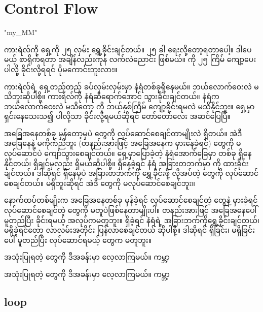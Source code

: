 \chapter{Control Flow}
\XeTeXlinebreaklocale "my_MM"  %
\begin{sloppypar}
\color{tungsten}
ကားရဲလ်ကို ရှေ့ကို ၂၅ လှမ်း ရွှေ့ခိုင်းချင်တယ်။  ၂၅ ခါ ရေးလို့‌တော့ရတာပေါ့။ ဒါပေမယ့် စာရိုက်ရတာ အချိန်လည်းကုန် လက်လဲညောင်း ဖြစ်မယ်။ {} ကို ၂၅ ကြိမ် ကျော့ပေးပါလို့ ခိုင်းလို့ရရင် ပိုမကောင်းဘူးလား။ 

ကားရဲလ်ရဲ့ ရှေ့တည့်တည့် ခပ်လှမ်းလှမ်းမှာ နံရံတစ်ခုရှိနေမယ်။ ဘယ်လောက်ဝေးလဲ မသိဘူးဆိုပါစို့။ ကားရဲလ်ကို နံရံဆီရောက်အောင် သွားခိုင်းချင်တယ်။ နံရံက ဘယ်လောက်ဝေးလဲ မသိတော့ {} ကို ဘယ်နှစ်ကြိမ် ကျော့ခိုင်းရမလဲ မသိနိုင်ဘူး။ ရှေ့မှာရှင်းနေသေးသ၍  ပါလို့သာ ခိုင်းလို့ရမယ်ဆိုရင် တော်တော်လေး အဆင်ပြေပြီ။ 

အခြေအနေတစ်ခု မှန်တော့မှပဲ \mmcommand တွေကို လုပ်ဆောင်စေချင်တာမျိုးလဲ ရှိတယ်။ အဲဒီ အခြေနေနဲ့ မကိုက်ညီဘူး (တနည်းအားဖြင့် အခြေအနေက မှားနေခဲ့ရင်) \mmcommand တွေကို မလုပ်ဆောင်ပဲ ကျော်သွားစေချင်တယ်။ ရှေ့မှာပြောခဲ့တဲ့ နံရံအောက််ခြေမှာ \mmbeeper တစ်ခု ရှိနေနိုင်တယ်၊ ရှိချင်မှလည်း ရှိမယ်ဆိုပါစို့။ \mmbeeper ရှိနေခဲ့ရင် နံရံ အခြားတဘက်မှာ \mmbeeper ကို ထားခိုင်းချင်တယ်။  ဒါဆိုရင် \mmbeeper ရှိနေမှပဲ အခြားတဘက်ကို ရွှေ့ခိုင်းဖို့ လိုအပ်တဲ့ \mmcommand တွေကို လုပ်ဆောင်စေချင်တယ်။ \mmbeeper မရှိဘူးဆိုရင် အဲဒီ \mmcommand တွေကို မလုပ်ဆောင်စေချင်ဘူး။  

 နောက်ထပ်တစ်မျိုးက အခြေအနေတစ်ခု မှန်ခဲ့ရင် လုပ်ဆောင်စေချင်တဲ့ \mmcommand တွေနဲ့ မှားခဲ့ရင်‌ လုပ်ဆောင်စေချင်တဲ့ \mmcommand ‌တွေကို မတူပဲဖြစ်နေတာမျိုးပါ။ တနည်းအားဖြင့် အခြေအနေပေါ် မူတည်ပြီး ခိုင်းရမယ့် အလုပ်ကမတူဘူး။ \mmbeeper ရှိခဲ့ရင် နံရံရဲ့ အခြားဘက်ကိုရွှေ့ခိုင်းချင်တယ်၊ မရှိခဲ့ရင်တော့ လာလမ်းအတိုင်း ပြန်လာစေချင်တယ် ဆိုပါစို့။ ဒါဆိုရင် \mmbeeper ရှိခြင်း၊ မရှိခြင်းပေါ် မူတည်ပြီး လုပ်ဆောင်ရမယ့် \mmcommand တွေက မတူဘူး။ 


 အသုံးပြုရတဲ့  \color{tungsten} တွေကို  ဒီအခန်းမှာ ‌လေ့လာကြမယ်။ ကမ္ဘာ့

 အသုံးပြုရတဲ့  \color{tungsten} တွေကို  ဒီအခန်းမှာ ‌လေ့လာကြမယ်။ ကမ္ဘာ့

 

 \section{{} loop}


\end{sloppypar}
